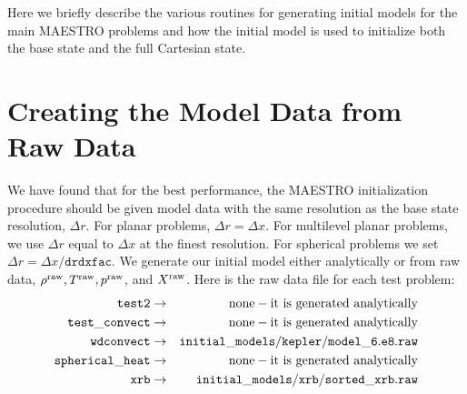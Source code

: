 Here we briefly describe the various routines for generating initial models
for the main MAESTRO problems and how the initial model is used to initialize
both the base state and the full Cartesian state.


\section{Creating the Model Data from Raw Data}\label{Sec:Creating the Model Data from Raw Data}
\label{sec:initial_models_main}

We have found that for the best performance, the MAESTRO initialization procedure should be given model data with the same resolution as the base state resolution, $\Delta r$.  For planar problems, $\Delta r = \Delta x$.  For multilevel planar problems, we use $\Delta r$ equal to $\Delta x$ at the finest resolution.  For spherical problems we set $\Delta r = \Delta x/\mathtt{drdxfac}$.  We generate our initial model either analytically or from raw data,
 $\rho^{\rm raw}, T^{\rm raw}, p^{\rm raw}$, and $X^{\rm raw}$.  
Here is the raw data file for each test problem:
\begin{eqnarray}
{\tt test2} & \rightarrow & \mathrm{none-it~ is~ generated~ analytically} \nonumber \nonumber \\
{\tt test\_convect} & \rightarrow & \mathrm{none-it~ is~ generated~ analytically} \nonumber \nonumber \\
{\tt wdconvect} & \rightarrow & {\tt initial\_models/kepler/model\_6.e8.raw} \nonumber \\
{\tt spherical\_heat} & \rightarrow & \mathrm{none-it~ is~ generated~ analytically} \nonumber \\
{\tt xrb} & \rightarrow & {\tt initial\_models/xrb/sorted\_xrb.raw} \nonumber
\end{eqnarray}

